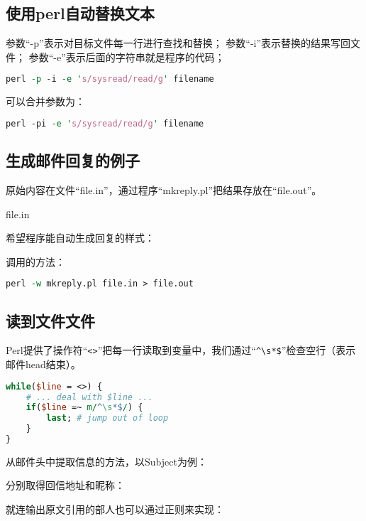 \subsection{使用perl自动替换文本}

参数“-p”表示对目标文件每一行进行查找和替换；
参数“-i”表示替换的结果写回文件；
参数“-e”表示后面的字符串就是程序的代码；

\begin{lstlisting}[language=Perl]
perl -p -i -e 's/sysread/read/g' filename
\end{lstlisting}

可以合并参数为：

\begin{lstlisting}[language=Perl]
perl -pi -e 's/sysread/read/g' filename
\end{lstlisting}

\subsection{生成邮件回复的例子}

原始内容在文件“file.in”，通过程序“mkreply.pl”把结果存放在“file.out”。

file.in



希望程序能自动生成回复的样式：



调用的方法：

\begin{lstlisting}[language=Perl]
perl -w mkreply.pl file.in > file.out
\end{lstlisting}

\subsection{读到文件文件}

Perl提供了操作符“\verb|<>|”把每一行读取到变量中，我们通过“\verb|^\s*$|”检查空行（表示邮件head结束）。

\begin{lstlisting}[language=Perl]
while($line = <>) {
	# ... deal with $line ...
	if($line =~ m/^\s*$/) {
		last; # jump out of loop
	}
}
\end{lstlisting}

从邮件头中提取信息的方法，以Subject为例：



分别取得回信地址和昵称：



就连输出原文引用的部人也可以通过正则来实现：



